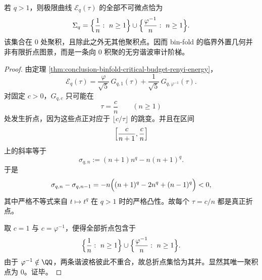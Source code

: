 \begin{corollary}[高阶审计曲线的无穷谐波折点结构]\label{cor:conclusion-binfold-harmonic-staircase-kinks}
若 \(q>1\)，则极限曲线 \(\mathcal E_q(\tau)\) 的全部不可微点恰为
\[
\Sigma_q=
\Bigl\{\frac1n:\ n\ge 1\Bigr\}
\cup
\Bigl\{\frac{\varphi^{-1}}{n}:\ n\ge 1\Bigr\}.
\]
该集合在 \(0\) 处聚积，且除此之外无其他聚积点。因而 bin-fold 的临界外置几何并非有限折点图景，而是一条向 \(0\) 积聚的无穷谐波审计阶梯。
\end{corollary}
\begin{proof}
由定理 \ref{thm:conclusion-binfold-critical-budget-renyi-energy}，
\[
\mathcal E_q(\tau)
=
\frac{\varphi}{\sqrt5}\,G_{q,1}(\tau)
+
\frac1{\sqrt5}\,G_{q,\varphi^{-1}}(\tau).
\]
对固定 \(c>0\)，\(G_{q,c}\) 只可能在
\[
\tau=\frac{c}{n}
\qquad (n\ge 1)
\]
处发生折点，因为这些点正对应于 \(\lfloor c/\tau\rfloor\) 的跳变。并且在区间
\[
\Bigl[\frac{c}{n+1},\frac{c}{n}\Bigr]
\]
上的斜率等于
\[
\sigma_{q,n}:=(n+1)n^q-n(n+1)^q.
\]
于是
\[
\sigma_{q,n}-\sigma_{q,n-1}
=
-n\Bigl((n+1)^q-2n^q+(n-1)^q\Bigr)<0,
\]
其中严格不等式来自 \(t\mapsto t^q\) 在 \(q>1\) 时的严格凸性。故每个 \(\tau=c/n\) 都是真正折点。

取 \(c=1\) 与 \(c=\varphi^{-1}\)，便得全部折点包含于
\[
\Bigl\{\frac1n:\ n\ge 1\Bigr\}
\cup
\Bigl\{\frac{\varphi^{-1}}{n}:\ n\ge 1\Bigr\}.
\]
由于 \(\varphi^{-1}\notin\QQ\)，两条谐波格彼此不重合，故总折点集恰为其并。显然其唯一聚积点为 \(0\)。证毕。
\end{proof}

